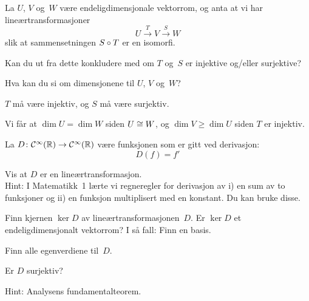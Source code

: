 \begin{oppgave}
La $U$, $V$ og~$W$ være endeligdimensjonale vektorrom, og
anta at vi har lineærtransformasjoner
\[
U \xrightarrow{T} V \xrightarrow{S} W
\]
slik at sammensetningen $S \circ T$ er en isomorfi.
\begin{punkt}
Kan du ut fra dette konkludere med om $T$ og~$S$ er injektive og/eller
surjektive?
\end{punkt}
\begin{punkt}
Hva kan du si om dimensjonene til $U$, $V$ og~$W$?
\end{punkt}
\end{oppgave}

\begin{losning}
\begin{punkt}
$T$ må være injektiv, og $S$ må være surjektiv.
\end{punkt}
\begin{punkt}
Vi får at $\dim U = \dim W$ siden $U \cong W$, og $\dim V \ge \dim U$
siden $T$ er injektiv.
\end{punkt}
\end{losning}


\begin{oppgave}
La $D \colon \mathcal{C}^\infty(\mathbb{R})\rightarrow \mathcal{C}^\infty(\mathbb{R})$
være funksjonen som er gitt ved derivasjon:
\[
D(f)=f'
\]
\begin{punkt}
Vis at $D$ er en lineærtransformasjon.
\\
Hint: I Matematikk~1 lærte vi regneregler for derivasjon av i) en sum
av to funksjoner og ii) en funksjon multiplisert med en konstant. Du
kan bruke disse.
\end{punkt}

\begin{punkt}
Finn kjernen $\ker D$ av lineærtransformasjonen~$D$.
Er $\ker D$ et endeligdimensjonalt vektorrom?  I så fall: Finn en basis.
\end{punkt}

\begin{punkt}
Finn alle egenverdiene til~$D$.
%
\end{punkt}

\begin{punkt}
Er $D$ surjektiv?

\noindent
Hint: Analysens fundamentalteorem.
\end{punkt}

\end{oppgave}

